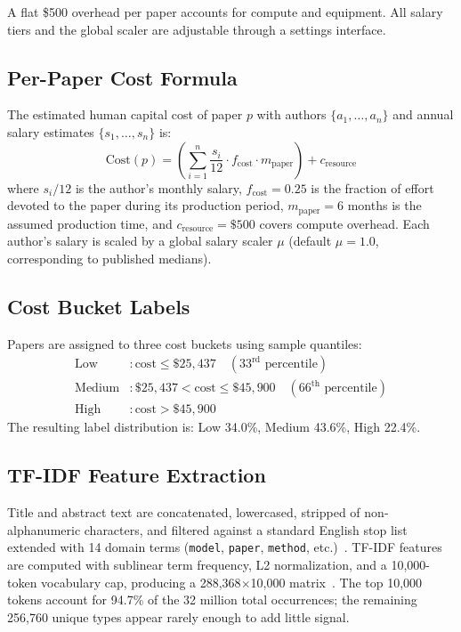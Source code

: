 \documentclass{article}
\begin{document}
A flat \$500 overhead per paper accounts for compute and equipment. All salary tiers and the global scaler are adjustable through a settings interface.

\subsection{Per-Paper Cost Formula}

The estimated human capital cost of paper $p$ with authors $\{a_1, \ldots, a_n\}$ and annual salary estimates $\{s_1, \ldots, s_n\}$ is:
\begin{equation}
    \text{Cost}(p) = \left(\sum_{i=1}^{n} \frac{s_i}{12} \cdot f_{\text{cost}} \cdot m_{\text{paper}}\right) + c_{\text{resource}}
\end{equation}
where $s_i/12$ is the author's monthly salary, $f_{\text{cost}} = 0.25$ is the fraction of effort devoted to the paper during its production period, $m_{\text{paper}} = 6$ months is the assumed production time, and $c_{\text{resource}} = \$500$ covers compute overhead. Each author's salary is scaled by a global salary scaler $\mu$ (default $\mu = 1.0$, corresponding to published medians).

\subsection{Cost Bucket Labels}

Papers are assigned to three cost buckets using sample quantiles:
\begin{align}
    \text{Low} &: \text{cost} \leq \$25,437 \quad (33^{\text{rd}} \text{ percentile}) \\
    \text{Medium} &: \$25,437 < \text{cost} \leq \$45,900 \quad (66^{\text{th}} \text{ percentile}) \\
    \text{High} &: \text{cost} > \$45,900
\end{align}
The resulting label distribution is: Low 34.0\%, Medium 43.6\%, High 22.4\%.

\subsection{TF-IDF Feature Extraction}

Title and abstract text are concatenated, lowercased, stripped of non-alphanumeric characters, and filtered against a standard English stop list extended with 14 domain terms (\texttt{model}, \texttt{paper}, \texttt{method}, etc.)~\cite{learningds2023}. TF-IDF features are computed with sublinear term frequency, L2 normalization, and a 10,000-token vocabulary cap, producing a 288,368$\times$10,000 matrix~\cite{vanderplalas2023}. The top 10,000 tokens account for 94.7\% of the 32 million total occurrences; the remaining 256,760 unique types appear rarely enough to add little signal.
\end{document}
